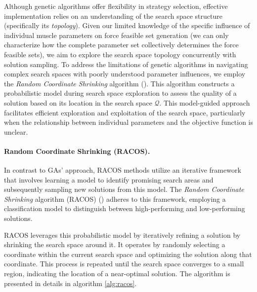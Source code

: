 Although genetic algorithms offer flexibility in strategy selection, effective implementation relies on an understanding of the search space structure (specifically its \emph{topology}). Given our limited knowledge of the specific influence of individual muscle parameters on force feasible set generation (we can only characterize how the complete parameter set collectively determines the force feasible sets), we aim to explore the search space topology concurrently with solution sampling. To address the limitations of genetic algorithms in navigating complex search spaces with poorly understood parameter influences, we employ the \emph{Random Coordinate Shrinking} algorithm (\cite{yuDerivativeFreeOptimizationClassification2016}). This algorithm constructs a probabilistic model during search space exploration to assess the quality of a solution based on its location in the search space $\mathcal{Q}$. This model-guided approach facilitates efficient exploration and exploitation of the search space, particularly when the relationship between individual parameters and the objective function is unclear.

\paragraph*{Random Coordinate Shrinking (RACOS).}
In contrast to GAs' approach, RACOS methods utilize an iterative framework that involves learning a model to identify promising search areas and subsequently sampling new solutions from this model. The \emph{Random Coordinate Shrinking} algorithm (RACOS) (\cite{yuDerivativeFreeOptimizationClassification2016}) adheres to this framework, employing a classification model to distinguish between high-performing and low-performing solutions.

RACOS leverages this probabilistic model by iteratively refining a solution by shrinking the search space around it. It operates by randomly selecting a coordinate within the current search space and optimizing the solution along that coordinate. This process is repeated until the search space converges to a small region, indicating the location of a near-optimal solution. The algorithm is presented in details in algorithm \ref{alg:racos}.

